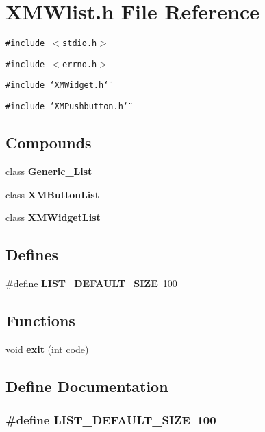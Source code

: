 \section{XMWlist.h File Reference}
\label{XMWlist_8h}
{\tt \#include $<$stdio.h$>$}\par
{\tt \#include $<$errno.h$>$}\par
{\tt \#include \char`\"{}XMWidget.h\char`\"{}}\par
{\tt \#include \char`\"{}XMPushbutton.h\char`\"{}}\par
\subsection*{Compounds}
\begin{CompactItemize}
\item 
class {\bf Generic\_\-List}
\item 
class {\bf XMButton\-List}
\item 
class {\bf XMWidget\-List}
\end{CompactItemize}
\subsection*{Defines}
\begin{CompactItemize}
\item 
\#define {\bf LIST\_\-DEFAULT\_\-SIZE}\ 100
\end{CompactItemize}
\subsection*{Functions}
\begin{CompactItemize}
\item 
void {\bf exit} (int code)
\end{CompactItemize}


\subsection{Define Documentation}
\subsubsection{\setlength{\rightskip}{0pt plus 5cm}\#define LIST\_\-DEFAULT\_\-SIZE\ 100}\label{XMWlist_8h_a0}





